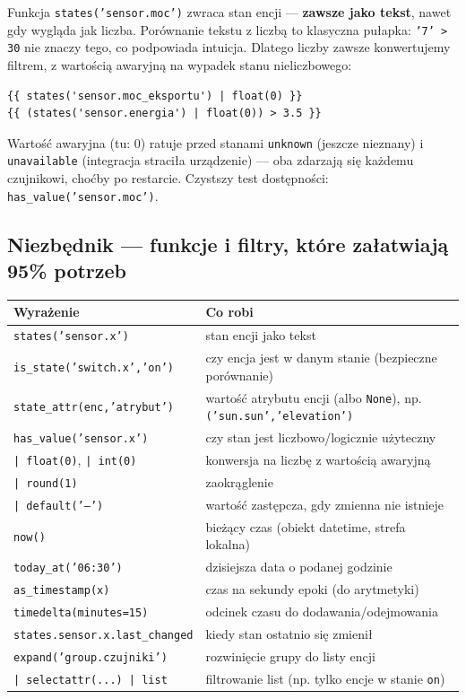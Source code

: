 \documentclass[11pt,a4paper]{article}
\begin{document}
Funkcja \texttt{states('sensor.moc')} zwraca stan encji --- \textbf{zawsze jako tekst}, nawet gdy wygląda jak liczba. Porównanie tekstu z liczbą to klasyczna pułapka: \texttt{'7' > 30} nie znaczy tego, co podpowiada intuicja. Dlatego liczby zawsze konwertujemy filtrem, z wartością awaryjną na wypadek stanu nieliczbowego:

\begin{lstlisting}
{{ states('sensor.moc_eksportu') | float(0) }}
{{ (states('sensor.energia') | float(0)) > 3.5 }}
\end{lstlisting}

Wartość awaryjna (tu: 0) ratuje przed stanami \texttt{unknown} (jeszcze nieznany) i \texttt{unavailable} (integracja straciła urządzenie) --- oba zdarzają się każdemu czujnikowi, choćby po restarcie. Czystszy test dostępności: \texttt{has\_value('sensor.moc')}.

\subsection{Niezbędnik --- funkcje i filtry, które załatwiają 95\% potrzeb}

\begin{center}
\begin{tabular}{lp{8.3cm}}
\toprule
\textbf{Wyrażenie} & \textbf{Co robi}\\
\midrule
\texttt{states('sensor.x')} & stan encji jako tekst\\
\texttt{is\_state('switch.x','on')} & czy encja jest w danym stanie (bezpieczne porównanie)\\
\texttt{state\_attr(enc,'atrybut')} & wartość atrybutu encji (albo \texttt{None}), np. \texttt{('sun.sun','elevation')}\\
\texttt{has\_value('sensor.x')} & czy stan jest liczbowo/logicznie użyteczny\\
\texttt{| float(0)}, \texttt{| int(0)} & konwersja na liczbę z wartością awaryjną\\
\texttt{| round(1)} & zaokrąglenie\\
\texttt{| default('---')} & wartość zastępcza, gdy zmienna nie istnieje\\
\texttt{now()} & bieżący czas (obiekt datetime, strefa lokalna)\\
\texttt{today\_at('06:30')} & dzisiejsza data o podanej godzinie\\
\texttt{as\_timestamp(x)} & czas na sekundy epoki (do arytmetyki)\\
\texttt{timedelta(minutes=15)} & odcinek czasu do dodawania/odejmowania\\
\texttt{states.sensor.x.last\_changed} & kiedy stan ostatnio się zmienił\\
\texttt{expand('group.czujniki')} & rozwinięcie grupy do listy encji\\
\texttt{| selectattr(...) | list} & filtrowanie list (np. tylko encje w stanie \texttt{on})\\
\bottomrule
\end{tabular}
\end{center}
\end{document}
